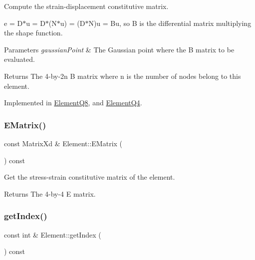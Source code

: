 Compute the strain-\/displacement constitutive matrix. 

e = D$\ast$u = D$\ast$(N$\ast$u) = (D$\ast$N)u = Bu, so B is the differential matrix multiplying the shape function.


\begin{DoxyParams}{Parameters}
{\em gaussian\+Point} & The Gaussian point where the B matrix to be evaluated. \\
\hline
\end{DoxyParams}
\begin{DoxyReturn}{Returns}
The 4-\/by-\/2n B matrix where n is the number of nodes belong to this element. 
\end{DoxyReturn}


Implemented in \mbox{\hyperlink{class_element_q8_afb41facf96d5bb4be5162724699e3e02}{Element\+Q8}}, and \mbox{\hyperlink{class_element_q4_a092a9584a1b3b22cd929246ba100f91a}{Element\+Q4}}.

\mbox{\label{class_element_abd9d11d211f4f5e6f9e213a1013f36ed}} 
\subsubsection{\texorpdfstring{E\+Matrix()}{EMatrix()}}
{\footnotesize\ttfamily const Matrix\+Xd \& Element\+::\+E\+Matrix (\begin{DoxyParamCaption}{ }\end{DoxyParamCaption}) const}



Get the stress-\/strain constitutive matrix of the element. 

\begin{DoxyReturn}{Returns}
The 4-\/by-\/4 E matrix. 
\end{DoxyReturn}
\mbox{\label{class_element_a85dc312253f1d39c29659393fbb1d485}} 
\subsubsection{\texorpdfstring{get\+Index()}{getIndex()}}
{\footnotesize\ttfamily const int \& Element\+::get\+Index (\begin{DoxyParamCaption}{ }\end{DoxyParamCaption}) const}



